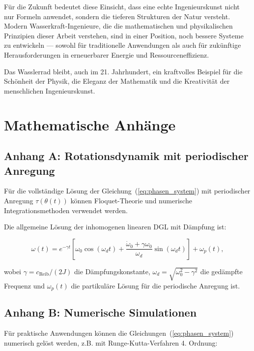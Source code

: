 \documentclass[a4paper,12pt]{article}
\theoremstyle{definition}
\begin{document}
Für die Zukunft bedeutet diese Einsicht, dass eine echte Ingenieurskunst nicht nur Formeln anwendet, sondern die tieferen Strukturen der Natur versteht. Modern Wasserkraft-Ingenieure, die die mathematischen und physikalischen Prinzipien dieser Arbeit verstehen, sind in einer Position, noch bessere Systeme zu entwickeln --- sowohl für traditionelle Anwendungen als auch für zukünftige Herausforderungen in erneuerbarer Energie und Ressourceneffizienz.

Das Wasslerrad bleibt, auch im 21. Jahrhundert, ein kraftvolles Beispiel für die Schönheit der Physik, die Eleganz der Mathematik und die Kreativität der menschlichen Ingenieurskunst.

\appendix

\section{Mathematische Anhänge}

\subsection{Anhang A: Rotationsdynamik mit periodischer Anregung}

Für die vollständige Lösung der Gleichung~(\ref{eq:phasen_system}) mit periodischer Anregung $\tau(\theta(t))$ können Floquet-Theorie und numerische Integrationsmethoden verwendet werden.

Die allgemeine Lösung der inhomogenen linearen DGL mit Dämpfung ist:

\begin{equation}
  \omega(t) = e^{-\gamma t}[\omega_0 \cos(\omega_d t) + \frac{\dot{\omega}_0 + \gamma\omega_0}{\omega_d}\sin(\omega_d t)]
  + \omega_p(t),
  \label{eq:loesung_allgemein}
\end{equation}

\noindent
wobei $\gamma = c_\text{Reib}/(2J)$ die Dämpfungskonstante, $\omega_d = \sqrt{\omega_0^2 - \gamma^2}$ die gedämpfte Frequenz und $\omega_p(t)$ die partikuläre Lösung für die periodische Anregung ist.

\subsection{Anhang B: Numerische Simulationen}

Für praktische Anwendungen können die Gleichungen~(\ref{eq:phasen_system}) numerisch gelöst werden, z.B. mit Runge-Kutta-Verfahren 4. Ordnung:
\end{document}
